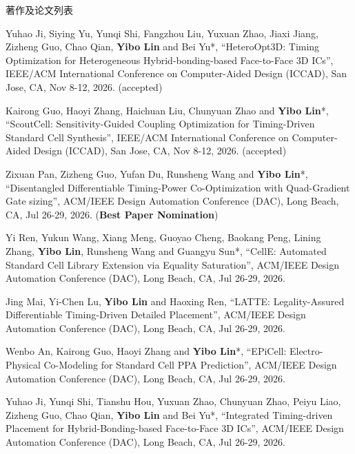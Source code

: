 \begin{rSection}{著作及论文列表}
\begin{description}[font=\normalfont, rightmargin=2em]
\item[{[C238]}]{
        Yuhao Ji, Siying Yu, Yunqi Shi, Fangzhou Liu, Yuxuan Zhao, Jiaxi Jiang, Zizheng Guo, Chao Qian, \textbf{Yibo Lin} and Bei Yu*, 
    ``HeteroOpt3D: Timing Optimization for Heterogeneous Hybrid-bonding-based Face-to-Face 3D ICs'', 
    IEEE/ACM International Conference on Computer-Aided Design (ICCAD), San Jose, CA, Nov 8-12, 2026.
    (accepted)
}
            

\item[{[C237]}]{
        Kairong Guo, Haoyi Zhang, Haichuan Liu, Chunyuan Zhao and \textbf{Yibo Lin}*, 
    ``ScoutCell: Sensitivity-Guided Coupling Optimization for Timing-Driven Standard Cell Synthesis'', 
    IEEE/ACM International Conference on Computer-Aided Design (ICCAD), San Jose, CA, Nov 8-12, 2026.
    (accepted)
}
            

\item[{[C236]}]{
        Zixuan Pan, Zizheng Guo, Yufan Du, Runsheng Wang and \textbf{Yibo Lin}*, 
    ``Disentangled Differentiable Timing-Power Co-Optimization with Quad-Gradient Gate sizing'', 
    ACM/IEEE Design Automation Conference (DAC), Long Beach, CA, Jul 26-29, 2026.
    (\textbf{Best Paper Nomination})
}
            

\item[{[C235]}]{
        Yi Ren, Yukun Wang, Xiang Meng, Guoyao Cheng, Baokang Peng, Lining Zhang, \textbf{Yibo Lin}, Runsheng Wang and Guangyu Sun*, 
    ``CellE: Automated Standard Cell Library Extension via Equality Saturation'', 
    ACM/IEEE Design Automation Conference (DAC), Long Beach, CA, Jul 26-29, 2026.
    
}
            

\item[{[C234]}]{
        Jing Mai, Yi-Chen Lu, \textbf{Yibo Lin} and Haoxing Ren, 
    ``LATTE: Legality-Assured Differentiable Timing-Driven Detailed Placement'', 
    ACM/IEEE Design Automation Conference (DAC), Long Beach, CA, Jul 26-29, 2026.
    
}
            

\item[{[C233]}]{
        Wenbo An, Kairong Guo, Haoyi Zhang and \textbf{Yibo Lin}*, 
    ``EPiCell: Electro-Physical Co-Modeling for Standard Cell PPA Prediction'', 
    ACM/IEEE Design Automation Conference (DAC), Long Beach, CA, Jul 26-29, 2026.
    
}
            

\item[{[C232]}]{
        Yuhao Ji, Yunqi Shi, Tianshu Hou, Yuxuan Zhao, Chunyuan Zhao, Peiyu Liao, Zizheng Guo, Chao Qian, \textbf{Yibo Lin} and Bei Yu*, 
    ``Integrated Timing-driven Placement for Hybrid-Bonding-based Face-to-Face 3D ICs'', 
    ACM/IEEE Design Automation Conference (DAC), Long Beach, CA, Jul 26-29, 2026.
    
}
\end{description}
\end{rSection}
